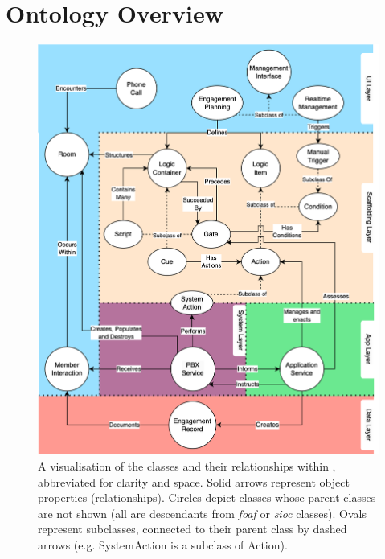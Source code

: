 \section{Ontology Overview}

\begin{figure}
  \centering
  \includegraphics[width=0.8\columnwidth]{images/simplified.drawio.png}
  \caption{A visualisation of the classes and their relationships within \ONT{}, abbreviated for clarity and space. Solid arrows represent object properties (relationships). Circles depict classes whose parent classes are not shown (all are descendants from \textit{foaf} or \textit{sioc} classes). Ovals represent subclasses, connected to their parent class by dashed arrows (e.g. SystemAction is a subclass of Action).}

\end{figure}
